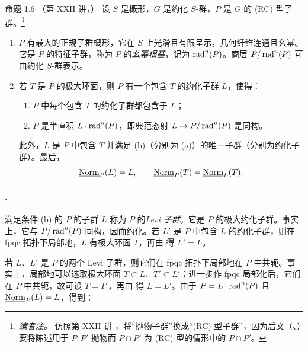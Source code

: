 \begin{sgastatement}{命题 1.6 \textup{（第 XXII 讲，）}}
设 \(S\) 是概形，\(G\) 是约化 \(S\)-群，\(P\) 是 \(G\) 的 \textup{(RC)} 型子群。\footnote{\emph{编者注。} 仿照第 XXII 讲 ，将“抛物子群”换成“(RC) 型子群”，因为后文（、）要将陈述用于 \(P,P'\) 抛物而 \(P\cap P'\) 为 (RC) 型的情形中的 \(P\cap P'\)。}
\begin{enumerate}[label=\textup{(\roman*)}]
\item \(P\) 有最大的正规子群概形，它在 \(S\) 上光滑且有限呈示，几何纤维连通且幺幂。它是 \(P\) 的特征子群，称为 \(P\) 的\emph{幺幂根基}，记为 \(\operatorname{rad}^u(P)\)。商层 \(P/\operatorname{rad}^u(P)\) 可由约化 \(S\)-群表示。
\item{} 若 \(T\) 是 \(P\) 的极大环面，则 \(P\) 有一个包含 \(T\) 的约化子群 \(L\)，使得：
\begin{enumerate}[label=\textup{(\alph*)}]
\item \(P\) 中每个包含 \(T\) 的约化子群都包含于 \(L\)；
\item \(P\) 是半直积 \(L\cdot\operatorname{rad}^u(P)\)，即典范态射 \(L\to P/\operatorname{rad}^u(P)\) 是同构。
\end{enumerate}
此外，\(L\) 是 \(P\) 中包含 \(T\) 并满足 (b)（分别为 (a)）的唯一子群（分别为约化子群）。最后，
\[
 \underline{\operatorname{Norm}}_P(L)=L,\qquad \underline{\operatorname{Norm}}_P(T)=\underline{\operatorname{Norm}}_L(T).
\]
\end{enumerate}
\end{sgastatement}

\paragraph{.}
满足条件 (b) 的 \(P\) 的子群 \(L\) 称为 \(P\) 的\emph{Levi 子群}。它是 \(P\) 的极大约化子群。事实上，它与 \(P/\operatorname{rad}^u(P)\) 同构，因而约化。若 \(L'\) 是 \(P\) 中包含 \(L\) 的约化子群，则在 fpqc 拓扑下局部地，\(L\) 有极大环面 \(T\)，再由  得 \(L'=L\)。

若 \(L\)、\(L'\) 是 \(P\) 的两个 Levi 子群，则它们在 fpqc 拓扑下局部地在 \(P\) 中共轭。事实上，局部地可以选取极大环面 \(T\subset L\)、\(T'\subset L'\)；进一步作 fpqc 局部化后，它们在 \(P\) 中共轭，故可设 \(T=T'\)，再由  得 \(L=L'\)。由于 \(P=L\cdot\operatorname{rad}^u(P)\) 且 \(\underline{\operatorname{Norm}}_P(L)=L\)，得到：


